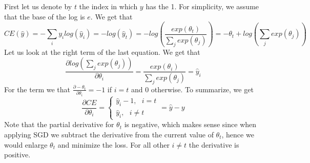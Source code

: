 First let us denote by $t$ the index in which $y$ has the 1. For simplicity, we assume that the base of the log is $e$.
We get that 
$$CE(\hat{y})= -\sum_i y_i log(\hat{y}_i)=-log(\hat{y}_t)=-log(\frac{exp(\theta_t)}{\sum_j exp(\theta_j)})=-\theta_t + log(\sum_j exp(\theta_j))$$
Let us look at the right term of the last equation. We get that $$\frac{\partial log(\sum_j exp(\theta_j))}{\partial \theta_i}=\frac{exp(\theta_i)}{\sum_j exp(\theta_j)}=\hat{y}_i$$
For the term we that $\frac{\partial -\theta_t}{\partial \theta_i}=-1$ if $i=t$ and $0$ otherwise. To summarize, we get 
$$
\frac{\partial CE}{\partial \theta_i}=
\begin{cases}
\hat{y}_i - 1, \text{ } i=t  \\ 
\hat{y}_i, \text{     } i\neq t
\end{cases} = \hat{y}-y
$$
Note that the partial derivative for $\theta_t$ is negative, which makes sense since when applying SGD we subtract the derivative from the current value of $\theta_t$, hence we would enlarge $\theta_t$ and minimize the loss. For all other $i \neq t$ the derivative is positive.